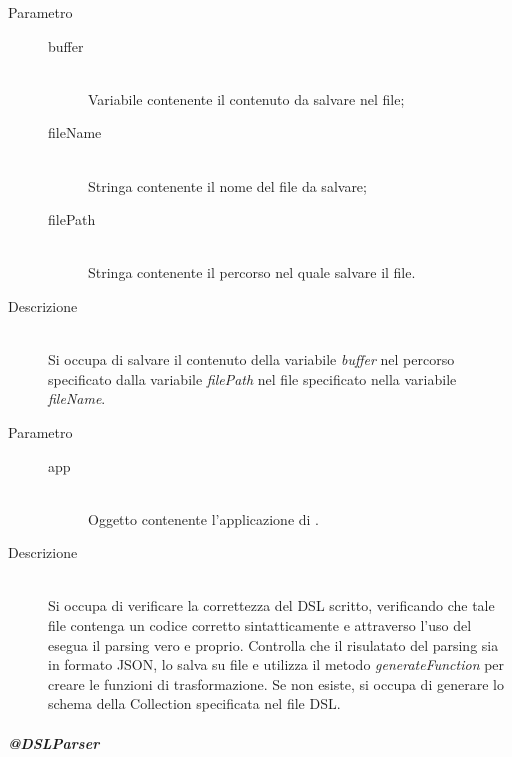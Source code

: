 \begin{description}
\begin{mldescription}
  \hfill 
  	\begin{description}
     		\item[Parametro] \hfill
     			\begin{description}
     				\item[buffer] \hfill \\
     				Variabile contenente il contenuto da salvare nel file;
     				\item[fileName] \hfill \\
     				Stringa contenente il nome del file da salvare;
     				\item[filePath] \hfill \\
     				Stringa contenente il percorso nel quale salvare il file.
     			\end{description}
     		\item[Descrizione] \hfill \\
     		Si occupa di salvare il contenuto della variabile \textit{buffer} nel percorso specificato dalla variabile \textit{filePath} nel file specificato nella variabile \textit{fileName}.
     \end{description}
     
  \hfill 
 	\begin{description}
    		\item[Parametro] \hfill
    			\begin{description}
    				\item[app] \hfill \\
    				Oggetto contenente l'applicazione di .
    			\end{description}
    		\item[Descrizione] \hfill \\
    		Si occupa di verificare la correttezza del DSL scritto, verificando che tale file contenga un codice corretto sintatticamente e attraverso l'uso del  esegua il parsing vero e proprio. Controlla che il risulatato del parsing sia in formato JSON, lo salva su file e utilizza il metodo \textit{generateFunction} per creare le funzioni di trasformazione. Se non esiste, si occupa di generare lo schema  della Collection specificata nel file DSL.
    \end{description}
 \end{mldescription}
 
\end{description}
\subparagraph{@DSLParser}
